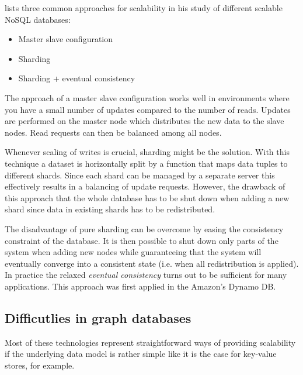 \documentclass{sig-alternate}
\begin{document}
\cite{tauro2012comparative} lists three common approaches for scalability in his study of different scalable NoSQL databases:
\begin{itemize}
	\item Master slave configuration
	\item Sharding
	\item Sharding + eventual consistency
\end{itemize}

The approach of a master slave configuration works well in environments where you have a small number of updates compared to the number of reads. Updates are performed on the master node which distributes the new data to the slave nodes. Read requests can then be balanced among all nodes.

Whenever scaling of writes is crucial, sharding might be the solution. With this technique a dataset is horizontally split by a function that maps data tuples to different shards. Since each shard can be managed by a separate server this effectively results in a balancing of update requests. However, the drawback of this approach that the whole database has to be shut down when adding a new shard since data in existing shards has to be redistributed.

The disadvantage of pure sharding can be overcome by easing the consistency constraint of the database. It is then possible to shut down only parts of the system when adding new nodes while guaranteeing that the system will eventually converge into a consistent state (i.e. when all redistribution is applied). In practice the relaxed \emph{eventual consistency} turns out to be sufficient for many applications. This approach was first applied in the Amazon's Dynamo DB.

\subsection{Difficutlies in graph databases}

Most of these technologies represent straightforward ways of providing scalability if the underlying data model is rather simple like it is the case for key-value stores, for example.
\end{document}
